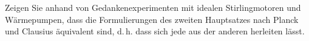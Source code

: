 Zeigen Sie anhand von Gedankenexperimenten mit idealen Stirlingmotoren und Wärmepumpen, dass die Formulierungen des zweiten Hauptsatzes nach Planck und Clausius äquivalent sind, d.\,h. dass sich jede aus der anderen herleiten lässt.
